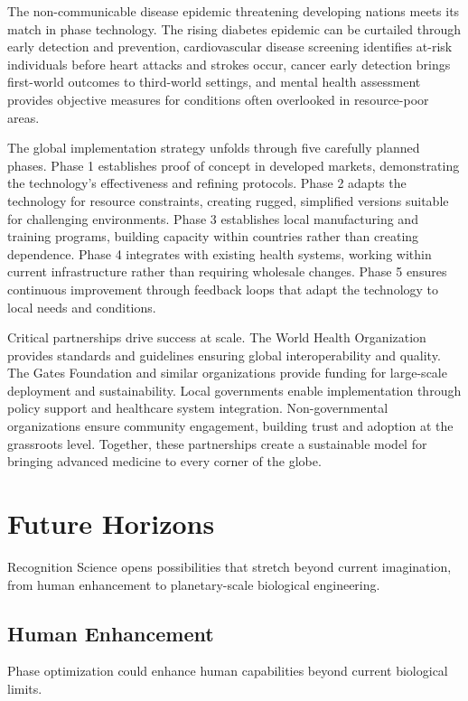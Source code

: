\documentclass[12pt,a4paper]{report}
\begin{document}
The non-communicable disease epidemic threatening developing nations meets its match in phase technology. The rising diabetes epidemic can be curtailed through early detection and prevention, cardiovascular disease screening identifies at-risk individuals before heart attacks and strokes occur, cancer early detection brings first-world outcomes to third-world settings, and mental health assessment provides objective measures for conditions often overlooked in resource-poor areas.

The global implementation strategy unfolds through five carefully planned phases. Phase 1 establishes proof of concept in developed markets, demonstrating the technology's effectiveness and refining protocols. Phase 2 adapts the technology for resource constraints, creating rugged, simplified versions suitable for challenging environments. Phase 3 establishes local manufacturing and training programs, building capacity within countries rather than creating dependence. Phase 4 integrates with existing health systems, working within current infrastructure rather than requiring wholesale changes. Phase 5 ensures continuous improvement through feedback loops that adapt the technology to local needs and conditions.

Critical partnerships drive success at scale. The World Health Organization provides standards and guidelines ensuring global interoperability and quality. The Gates Foundation and similar organizations provide funding for large-scale deployment and sustainability. Local governments enable implementation through policy support and healthcare system integration. Non-governmental organizations ensure community engagement, building trust and adoption at the grassroots level. Together, these partnerships create a sustainable model for bringing advanced medicine to every corner of the globe.

\chapter{Future Horizons}

Recognition Science opens possibilities that stretch beyond current imagination, from human enhancement to planetary-scale biological engineering.

\section{Human Enhancement}

Phase optimization could enhance human capabilities beyond current biological limits.
\end{document}
